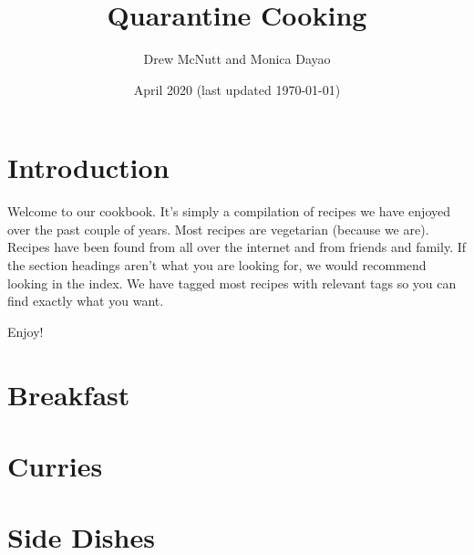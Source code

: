 \documentclass{article}
\title{Quarantine Cooking}
\author{Drew McNutt and Monica Dayao}
\date{April 2020 (last updated \today)}
\begin{document}
\maketitle
\tableofcontents
\newpage
\section{Introduction}
Welcome to our cookbook. It's simply a compilation of recipes we have enjoyed over the past couple of years. Most recipes are vegetarian (because we are). Recipes have been found from all over the internet and from friends and family. If the section headings aren't what you are looking for, we would recommend looking in the index. We have tagged most recipes with relevant tags so you can find exactly what you want.


\begin{center}
    \huge Enjoy!
\end{center}{}

\newpage
\section{Breakfast}


\newpage


\newpage


\newpage


\newpage


\newpage
\section{Curries}


\newpage


\newpage
\section{Side Dishes}


\newpage


\newpage


\newpage


\newpage


\newpage

\end{document}
